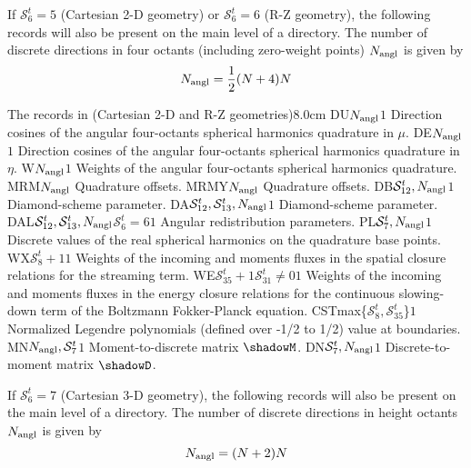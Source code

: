 If $\mathcal{S}^{t}_{6}=5$ (Cartesian 2-D geometry) or $\mathcal{S}^{t}_{6}=6$ (R-Z geometry), the following records will also be present on the main level of a 
directory. The number of discrete directions in four octants (including zero-weight points) $N_{\rm angl}$ is given by
$$
N_{\rm angl}={1\over 2}(N+4)N
$$

\begin{DescriptionEnregistrement}{The  records in
 (Cartesian 2-D and R-Z geometries)}{8.0cm}
\RealEnr
  {DU}{$N_{\rm angl}$}{$1$}
  {Direction cosines of the angular four-octants spherical harmonics quadrature in $\mu$.} 
\RealEnr
  {DE}{$N_{\rm angl}$}{$1$}
  {Direction cosines of the angular four-octants spherical harmonics quadrature in $\eta$.} 
\RealEnr
  {W}{$N_{\rm angl}$}{$1$}
  {Weights of the angular four-octants spherical harmonics quadrature.} 
\IntEnr
  {MRM}{$N_{\rm angl}$}
  {Quadrature offsets.} 
\IntEnr
  {MRMY}{$N_{\rm angl}$}
  {Quadrature offsets.} 
\RealEnr
  {DB}{$\mathcal{S}^{t}_{12},N_{\rm angl}$}{$1$}
  {Diamond-scheme parameter.} 
\RealEnr
  {DA}{$\mathcal{S}^{t}_{12},\mathcal{S}^{t}_{13},N_{\rm angl}$}{$1$}
  {Diamond-scheme parameter.} 
\OptRealEnr
  {DAL}{$\mathcal{S}^{t}_{12},\mathcal{S}^{t}_{13},N_{\rm angl}$}{$\mathcal{S}^{t}_{6}=6$}{$1$}
  {Angular redistribution parameters.} 
\RealEnr
  {PL}{$\mathcal{S}^{t}_{7},N_{\rm angl}$}{$1$}
  {Discrete values of the real spherical harmonics on the quadrature base points.} 
\RealEnr
  {WX}{$\mathcal{S}^{t}_{8}+1$}{$1$}
  {Weights of the incoming and moments fluxes in the spatial closure relations for the streaming term.}
\OptRealEnr
  {WE}{$\mathcal{S}^{t}_{35}+1$}{$\mathcal{S}^{t}_{31}\neq0$}{$1$}
  {Weights of the incoming and moments fluxes in the energy closure relations for the continuous slowing-down term of the Boltzmann Fokker-Planck equation.}
\RealEnr
  {CST}{max\{$\mathcal{S}^{t}_{8},\mathcal{S}^{t}_{35}$\}}{$1$}
  {Normalized Legendre polynomials (defined over -1/2 to 1/2) value at boundaries.}
\RealEnr
  {MN}{$N_{\rm angl},\mathcal{S}^{t}_{7}$}{$1$}
  {Moment-to-discrete matrix $\shadowM$.} 
\RealEnr
  {DN}{$\mathcal{S}^{t}_{7},N_{\rm angl}$}{$1$}
  {Discrete-to-moment matrix $\shadowD$.} 
\end{DescriptionEnregistrement}

If $\mathcal{S}^{t}_{6}=7$ (Cartesian 3-D geometry), the following records will also be present on the main level of a 
directory. The number of discrete directions in height octants  $N_{\rm angl}$ is given by
$$
N_{\rm angl}=(N+2)N
$$

